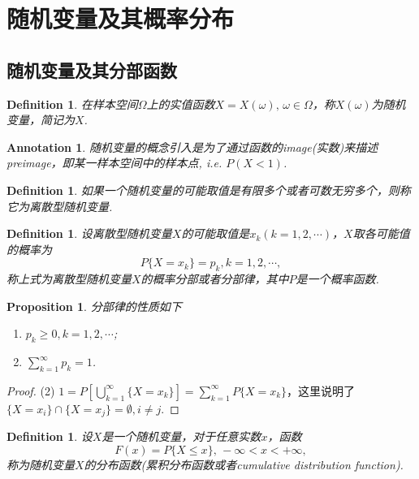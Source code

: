 \documentclass{article}
\newtheorem{proposition}[theorem]{Proposition}
\newtheorem{definition}[theorem]{Definition}
\newtheorem{annotation}[theorem]{Annotation}
\begin{document}
\section{随机变量及其概率分布}

\subsection{随机变量及其分部函数}

\begin{definition}
\rm 在样本空间$\Omega$上的实值函数$X=X(\omega),\, \omega \in \Omega$，称$X(\omega)$为{\color{red}随机变量}，简记为$X$.  
\end{definition}

\begin{annotation}
\rm 随机变量的概念引入是为了通过函数的image(实数)来描述preimage，即某一样本空间中的样本点, i.e. $P(X < 1)$. 
\end{annotation}

\begin{definition}
\rm 如果一个随机变量的可能取值是有限多个或者可数无穷多个，则称它为{\color{red}离散型随机变量}.
\end{definition}

\begin{definition}
\rm 设离散型随机变量$X$的可能取值是$x_k(k=1,2,\cdots)$，$X$取各可能值的概率为
$$
P\{X=x_k\} = p_k, k=1,2,\cdots,
$$
称上式为离散型随机变量$X$的概率分部或者分部律，其中$P$是一个概率函数.
\end{definition}

\begin{proposition}
\rm 分部律的性质如下
\begin{enumerate}
	\item $p_k \geq 0,k=1,2,\cdots$;
	\item $\sum\limits_{k=1}^\infty p_k = 1$.
\end{enumerate}
\end{proposition}

\begin{proof}
{\color{red}(2)} $1 = P[\bigcup\limits_{k=1}^{\infty}\{X= x_k\}] = \sum\limits_{k=1}^{\infty} P\{X=x_k\}$，这里说明了$\{X=x_i\} \cap \{X = x_j\} = \emptyset, i \neq j$.
\end{proof}

\begin{definition}
\rm 设$X$是一个随机变量，对于任意实数$x$，函数
$$
F(x) = P\{X \leq x\},\,-\infty < x < +\infty,
$$
称为随机变量$X$的分布函数(累积分布函数或者cumulative distribution function). 
\end{definition}
\end{document}
